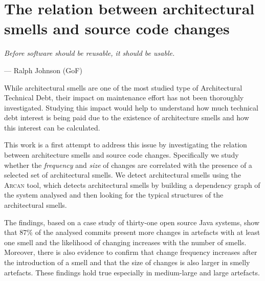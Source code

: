 \setlength{\headheight}{1.2cm}
\renewcommand{\publ}{\flushleft\footnotesize{Based on:\\[0.1cm]
		\textit{D. Sas, P. Avgeriou, I. Pigazzini, and F. Arcelli F. (2022). On the relation between architectural smells and source code changes. Journal of Software: Evolution and Process, 34(1), e2398.} \\[0.1cm]
}}

\chapter{The relation between architectural smells and source code changes}
\label{chap:5}
\epigraph{\emph{Before software should be reusable, it should be usable.}}{--- Ralph Johnson (GoF)}

\begin{Abstract}
	While architectural smells are one of the most studied type of Architectural Technical Debt, their impact on maintenance effort has not been thoroughly investigated.
	Studying this impact would help to understand how much technical debt interest is being paid due to the existence of architecture smells and how this interest can be calculated.
	
	This work is a first attempt to address this issue by investigating the relation between architecture smells and source code changes. Specifically we study whether the \emph{frequency} and \emph{size} of changes are correlated with the presence of a selected set of architectural smells.
	We detect architectural smells using the \textsc{Arcan} tool, which detects architectural smells by building a dependency graph of the system analysed and then looking for the typical structures of the architectural smells.
	
	The findings, based on a case study of thirty-one open source Java systems, show that $87$\% of the analysed commits present more changes in artefacts with at least one smell and the likelihood of changing increases with the number of smells.
	Moreover, there is also evidence to confirm that change frequency increases after the introduction of a smell and that the size of changes is also larger in smelly artefacts.
	These findings hold true especially in medium-large and large artefacts.
\end{Abstract}


